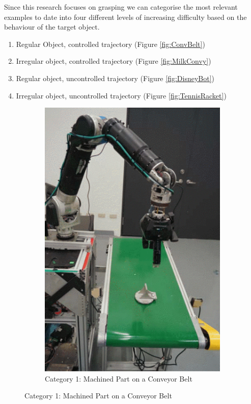 Since this research focuses on grasping we can categorise the most relevant examples to date into four different levels of increasing difficulty based on the behaviour of the target object.

\begin{enumerate}
    \item Regular Object, controlled trajectory (Figure \ref{fig:ConvBelt})
    \item Irregular object, controlled trajectory (Figure \ref{fig:MilkConvy})
    \item Regular object, uncontrolled trajectory (Figure \ref{fig:DisneyBot})
    \item Irregular object, uncontrolled trajectory (Figure \ref{fig:TennisRacket}) 
\end{enumerate}

\begin{figure}
    \centering
    \begin{subfigure}{.4\linewidth}
        \centering
        \includegraphics[width=.8\textwidth]{Images/ConveyorBelt.png}
        \caption[Category 1: Machined Part on a Conveyor Belt]{Category 1: Machined Part on a Conveyor Belt \cite{ConveyorBeltTracking}}

\end{subfigure}
\end{figure}
